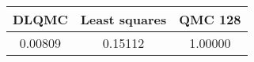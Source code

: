 \begin{tabular}{|c|c|c|}
\hline
DLQMC&Least squares&QMC 128\\ 
\hline

0.00809 & 0.15112 & 1.00000\\ 
\hline
\end{tabular}

